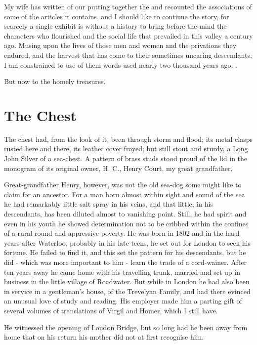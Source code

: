 
My wife has written of our putting together the  and recounted the associations of some of the articles it contains, and I should like to continue the story, for scarcely a single exhibit is without a history to bring before the mind the characters who flourished and the social life that prevailed in this valley a century ago. Musing upon the lives of those men and women and the privations they endured, and the harvest that has come to their sometimes uncaring descendants, I am constrained to use of them words used nearly two thousand years ago: .

But now to the homely treasures.
 
\section{The Chest} 
 
The chest had, from the look of it, been through storm and flood; its metal clasps rusted here and there, its leather cover frayed; but still stout and sturdy, a Long John Silver of a sea-chest. A pattern of brass studs stood proud of the lid in the monogram of its original owner, H. C., Henry Court, my great grandfather.

Great-grandfather Henry, however, was not the old sea-dog some might like to claim for an ancestor. For a man born almost within sight and sound of the sea he had remarkably little salt spray in his veins, and that little, in his descendants, has been diluted almost to vanishing point. Still, he had spirit and even in his youth he showed determination not to be cribbed within the confines of a rural round and appressive poverty. He was born in 1802 and in the hard years after Waterloo, probably in his late teens, he set out for London to seek his fortune. He failed to find it, and this set the pattern for his descendants, but he did - which was more important to him - learn the trade of a cord-wainer. After ten years away he came home with his travelling trunk, married and set up in business in the little village of Roadwater. But while in London he had also been in service in a gentleman's house, of the Trevelyan Family, and had there evinced an unusual love of study and reading. His employer made him a parting gift of several volumes of translations of Virgil and Homer, which I still have.

He witnessed the opening of London Bridge, but so long had he been away from home that on his return his mother did not at first recognise him.

